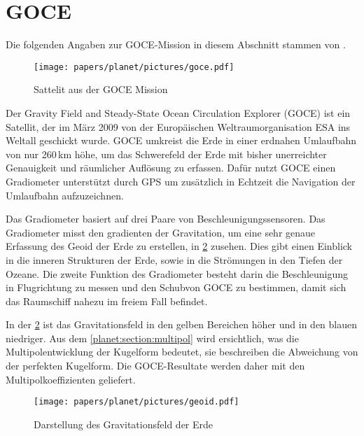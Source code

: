 %
%
%
%
\section{GOCE
\label{planet:section:goce}}

Die folgenden Angaben zur GOCE-Mission in diesem Abschnitt stammen von \cite{planet:goce}.

\begin{figure}[h]
    \centering
    \texttt{[image: papers/planet/pictures/goce.pdf]}
    \caption{Sattelit aus der GOCE Mission \cite{planet:gocepic}
        \label{planet:fig:goce}}
\end{figure}

Der Gravity Field and Steady-State Ocean Circulation Explorer (GOCE) ist ein Satellit, der im März 2009 von der Europäischen Weltraumorganisation ESA ins Weltall geschickt wurde.
GOCE umkreist die Erde in einer erdnahen Umlaufbahn von nur 260\,km höhe, um das Schwerefeld der Erde mit bisher unerreichter Genauigkeit und räumlicher Auflösung zu erfassen.
Dafür nutzt GOCE einen Gradiometer unterstützt durch GPS um zusätzlich in Echtzeit die Navigation der Umlaufbahn aufzuzeichnen.

Das Gradiometer basiert auf drei Paare von Beschleunigungssensoren.
Das Gradiometer misst den gradienten der Gravitation, um eine sehr genaue Erfassung des Geoid der Erde zu erstellen, in \cref{planet:fig:geoid} zusehen.
Dies gibt einen Einblick in die inneren Strukturen der Erde, sowie in die Strömungen in den Tiefen der Ozeane.
Die zweite Funktion des Gradiometer besteht darin die Beschleunigung in Flugrichtung zu messen und den Schubvon GOCE zu bestimmen, damit sich das Raumschiff nahezu im freiem Fall befindet.

In der \cref{planet:fig:geoid} ist das Gravitationsfeld in den gelben Bereichen höher und in den blauen niedriger.
Aus dem \cref{planet:section:multipol} wird ersichtlich, was die Multipolentwicklung der Kugelform bedeutet, sie beschreiben die Abweichung von der perfekten Kugelform.
Die GOCE-Resultate werden daher mit den Multipolkoeffizienten geliefert.

\begin{figure}[h]
    \centering
    \texttt{[image: papers/planet/pictures/geoid.pdf]}
    \caption{Darstellung des Gravitationsfeld der Erde \cite{planet:geoidpic}
        \label{planet:fig:geoid}}
\end{figure}


